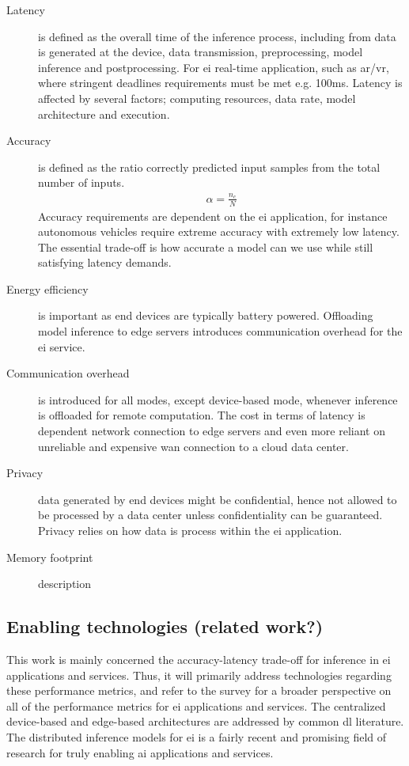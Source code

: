 \begin{description}
	\item[Latency] is defined as the overall time of the inference process, including from data is generated at the device, data transmission, preprocessing, model inference and postprocessing. For \gls{ei} real-time application, such as \gls{ar}/\gls{vr}, where stringent deadlines requirements must be met e.g. 100ms. Latency is affected by several factors; computing resources, data rate, model architecture and execution.
	\item[Accuracy] is defined as the ratio correctly predicted input samples from the total number of inputs. 
	\begin{align*}
		\alpha = \frac{n_c}{N}
	\end{align*}
	Accuracy requirements are dependent on the \gls{ei} application, for instance autonomous vehicles require extreme accuracy with extremely low latency. The essential trade-off is how accurate a model can we use while still satisfying latency demands.  
	\item[Energy efficiency] is important as end devices are typically battery powered. Offloading model inference to edge servers introduces communication overhead for the \gls{ei} service.
	\item[Communication overhead] is introduced for all modes, except device-based mode, whenever inference is offloaded for remote computation. The cost in terms of latency is dependent network connection to edge servers and even more reliant on unreliable and expensive \gls{wan} connection to a cloud data center. 
	\item[Privacy] data generated by end devices might be confidential, hence not allowed to be processed by a data center unless confidentiality can be guaranteed. Privacy relies on how data is process within the \gls{ei} application.  
	
	\item[Memory footprint] description
\end{description}

\subsection{Enabling technologies (related work?)}

This work is mainly concerned the accuracy-latency trade-off for inference in \gls{ei} applications and services. Thus, it will primarily address technologies regarding these performance metrics, and refer to the survey for a broader perspective on all of the performance metrics for \gls{ei} applications and services. The centralized device-based and edge-based architectures are addressed by common \gls{dl} literature. The distributed inference models for \gls{ei} is a fairly recent and promising field of research for truly enabling \gls{ai} applications and services.

